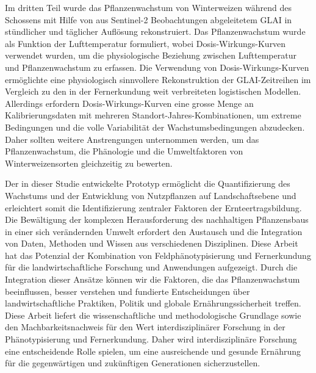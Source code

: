 Im dritten Teil wurde das Pflanzenwachstum von Winterweizen während des Schossens mit Hilfe von aus Sentinel-2 Beobachtungen abgeleitetem GLAI in stündlicher und täglicher Auflösung rekonstruiert. Das Pflanzenwachstum wurde als Funktion der Lufttemperatur formuliert, wobei Dosis-Wirkungs-Kurven verwendet wurden, um die physiologische Beziehung zwischen Lufttemperatur und Pflanzenwachstum zu erfassen. Die Verwendung von Dosis-Wirkungs-Kurven ermöglichte eine physiologisch sinnvollere Rekonstruktion der GLAI-Zeitreihen im Vergleich zu den in der Fernerkundung weit verbreiteten logistischen Modellen. Allerdings erfordern Dosis-Wirkungs-Kurven eine grosse Menge an Kalibrierungsdaten mit mehreren Standort-Jahres-Kombinationen, um extreme Bedingungen und die volle Variabilität der Wachstumsbedingungen abzudecken. Daher sollten weitere Anstrengungen unternommen werden, um das Pflanzenwachstum, die Phänologie und die Umweltfaktoren von Winterweizensorten gleichzeitig zu bewerten.

Der in dieser Studie entwickelte Prototyp ermöglicht die Quantifizierung des Wachstums und der Entwicklung von Nutzpflanzen auf Landschaftsebene und erleichtert somit die Identifizierung zentraler Faktoren der Ernteertragsbildung. Die Bewältigung der komplexen Herausforderung des nachhaltigen Pflanzensbaus in einer sich verändernden Umwelt erfordert den Austausch und die Integration von Daten, Methoden und Wissen aus verschiedenen Disziplinen. Diese Arbeit hat das Potenzial der Kombination von Feldphänotypisierung und Fernerkundung für die landwirtschaftliche Forschung und Anwendungen aufgezeigt. Durch die Integration dieser Ansätze können wir die Faktoren, die das Pflanzenwachstum beeinflussen, besser verstehen und fundierte Entscheidungen über landwirtschaftliche Praktiken, Politik und globale Ernährungssicherheit treffen. Diese Arbeit liefert die wissenschaftliche und methodologische Grundlage sowie den Machbarkeitsnachweis für den Wert interdisziplinärer Forschung in der Phänotypisierung und Fernerkundung. Daher wird interdisziplinäre Forschung eine entscheidende Rolle spielen, um eine ausreichende und gesunde Ernährung für die gegenwärtigen und zukünftigen Generationen sicherzustellen.